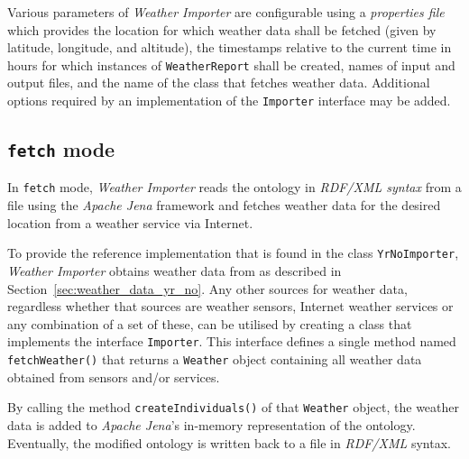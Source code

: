 Various parameters of \emph{Weather Importer} are configurable using a \emph{properties file}~\cite{java_properties} which provides the location for which weather data shall be fetched (given by latitude, longitude, and altitude), the timestamps relative to the current time in hours for which instances of \texttt{WeatherReport} shall be created, names of input and output files, and the name of the class that fetches weather data. Additional options required by an implementation of the \texttt{Importer} interface may be added.

\subsection{\texttt{fetch} mode}
\label{subsec:importer_fetch}

In \texttt{fetch} mode, \emph{Weather Importer} reads the \smarthomeweather ontology in \emph{RDF/XML syntax} from a file using the \emph{Apache Jena} framework and fetches weather data for the desired location from a weather service via Internet.

To provide the reference implementation that is found in the class \texttt{YrNoImporter}, \emph{Weather Importer} obtains weather data from \yrno as described in Section~\ref{sec:weather_data_yr_no}. Any other sources for weather data, regardless whether that sources are weather sensors, Internet weather services or any combination of a set of these, can be utilised by creating a class that implements the interface \texttt{Importer}. This interface defines a single method named \texttt{fetchWeather()} that returns a \texttt{Weather} object containing all weather data obtained from sensors and/or services.

By calling the method \texttt{createIndividuals()} of that \texttt{Weather} object, the weather data is added to \emph{Apache Jena}'s in-memory representation of the ontology. Eventually, the modified ontology is written back to a file in \emph{RDF/XML} syntax.

